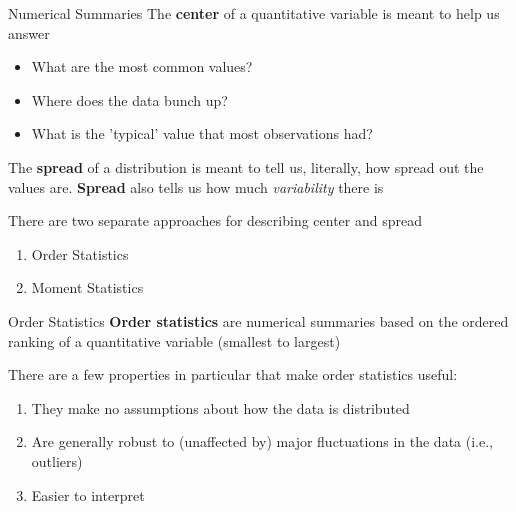 \documentclass{beamer}
\begin{document}
\begin{frame}{Numerical Summaries}
The \textbf{center} of a quantitative variable is meant to help us answer
\begin{itemize}
    \item What are the most common values?
    \item Where does the data bunch up?
    \item What is the 'typical' value that most observations had?
\end{itemize} \vspace{4mm}


The \textbf{spread} of a distribution is meant to tell us, literally, how spread out the values are. \textbf{Spread} also tells us how much \textit{variability} there is \vspace{5mm}

There are two separate approaches for describing center and spread \\ \vspace{2mm}

\begin{enumerate}
\item Order Statistics
\item Moment Statistics
\end{enumerate}
\end{frame}



\begin{frame}{Order Statistics}
\textbf{Order statistics} are numerical summaries based on the ordered ranking of a quantitative variable (smallest to largest) \vspace{4mm}

There are a few properties in particular that make order statistics useful:
\begin{enumerate}
\item They make no assumptions about how the data is distributed
\item Are generally robust to (unaffected by) major fluctuations in the data (i.e., outliers)
\item Easier to interpret
\end{enumerate} \vspace{4mm}
\end{frame}
\end{document}
